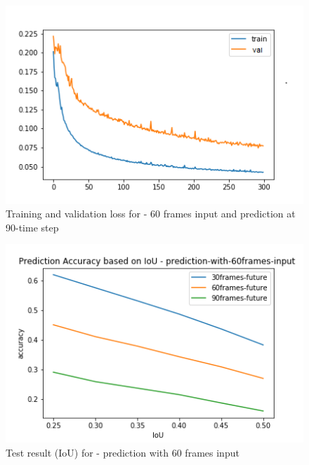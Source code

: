 \begin{figure}[H] 
\includegraphics[scale=0.8]{conf13_300e_60_90ffuture}
\begin{center}
\caption{Training and validation loss for - 60 frames input and prediction at 90-time step }
\label{60-90}
\end{center}
\end{figure}

\begin{figure}[H] 
\includegraphics[scale=0.8]{prediction-with-60frames-input_IoU.png}
\begin{center}
\caption{Test result (IoU) for - prediction with 60 frames input}
\label{60-IoU}
\end{center}
\end{figure}

